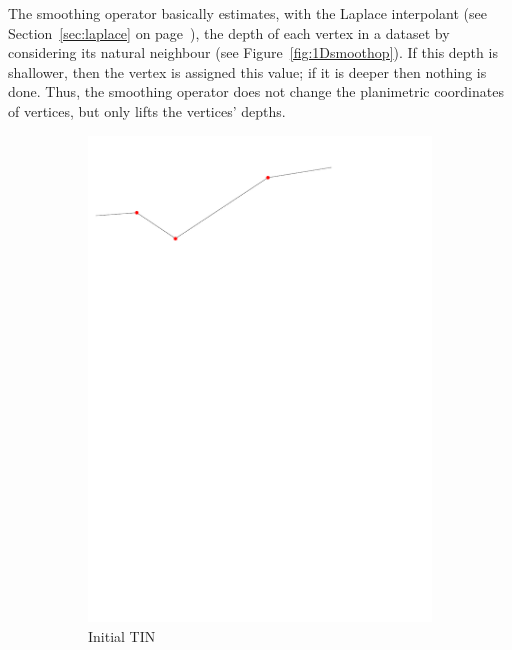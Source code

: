 The smoothing operator basically estimates, with the Laplace interpolant (see Section~\ref{sec:laplace} on page~\pageref{sec:laplace}), the depth of each vertex in a dataset by considering its natural neighbour (see Figure~\ref{fig:1Dsmoothop}).
If this depth is shallower, then the vertex is assigned this value; if it is deeper then nothing is done.
Thus, the smoothing operator does not change the planimetric coordinates of vertices, but only lifts the vertices' depths. 
\begin{figure}[tbh]
  \centering
  \begin{subfigure}[b]{0.45\linewidth}
    \centering
    \includegraphics[width=\textwidth,page=1]{figs/1Dsmoothop.pdf}
    \caption{Initial TIN}\label{fig:1Dsmoothop:a}
  \end{subfigure}
  \quad
  \begin{subfigure}[b]{0.45\linewidth}
    \centering

\end{subfigure}
\end{figure}
